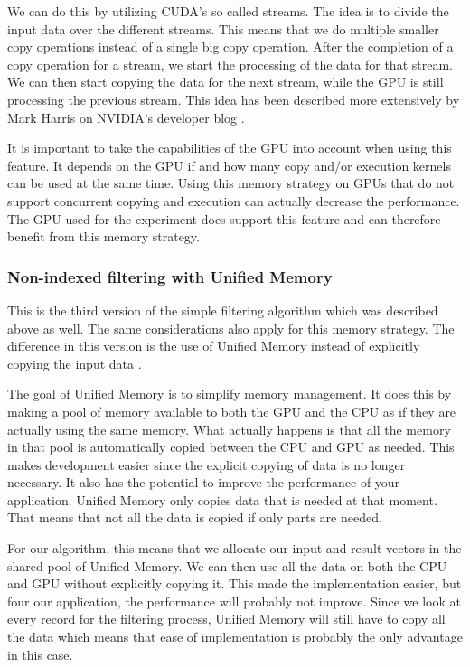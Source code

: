 \documentclass[a4paper,titlepage]{article}
\begin{document}
We can do this by utilizing CUDA's so called streams. The idea is to divide the input data over the different streams. This means that we do multiple smaller copy operations instead of a single big copy operation. After the completion of a copy operation for a stream, we start the processing of the data for that stream. We can then start copying the data for the next stream, while the GPU is still processing the previous stream. This idea has been described more extensively by Mark Harris on NVIDIA's developer blog \cite{cuda-overlap-streams}.

It is important to take the capabilities of the GPU into account when using this feature. It depends on the GPU if and how many copy and/or execution kernels can be used at the same time. Using this memory strategy on GPUs that do not support concurrent copying and execution can actually decrease the performance. The GPU used for the experiment does support this feature and can therefore benefit from this memory strategy.

\subsubsection{Non-indexed filtering with Unified Memory}
This is the third version of the simple filtering algorithm which was described above as well. The same considerations also apply for this memory strategy. The difference in this version is the use of Unified Memory instead of explicitly copying the input data \cite{harris2013}.

The goal of Unified Memory is to simplify memory management. It does this by making a pool of memory available to both the GPU and the CPU as if they are actually using the same memory. What actually happens is that all the memory in that pool is automatically copied between the CPU and GPU as needed. This makes development easier since the explicit copying of data is no longer necessary. It also has the potential to improve the performance of your application. Unified Memory only copies data that is needed at that moment. That means that not all the data is copied if only parts are needed.

For our algorithm, this means that we allocate our input and result vectors in the shared pool of Unified Memory. We can then use all the data on both the CPU and GPU without explicitly copying it. This made the implementation easier, but four our application, the performance will probably not improve. Since we look at every record for the filtering process, Unified Memory will still have to copy all the data which means that ease of implementation is probably the only advantage in this case.
\end{document}
